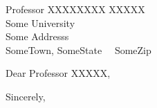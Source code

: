 \documentclass[12pt]{NUAAletter}
\date{\vspace{10mm} \today}
\makeatletter
\def\name{Your Name}
\def\Position{\vspace*{.5\baselineskip}\textbf{\color{nuaablue}Chair for Doing Nothing But Sleeping and Eating}}
\def\Title{\hspace{-1.2mm}\textbf{\color{nuaablue}Prof.~Dr.~\name}}
\def\TEL{
\vspace*{.5\baselineskip}
\textbf{Contact}\\
{\color{nuaablue}Phone}: +86-12345678987}
\def\Where{
\vspace*{.5\baselineskip}
\textbf{\color{nuaablue}
College of Zhihu, Bilibili, and Youtube Engineering
}}
\def\Address{29 Jiangjun Ave., Nanjing~211106, China}
\def\Email{{\color{nuaablue}e-mail}: your.name@nuaa.edu.cn}
\def\Website{{\color{nuaablue}website}: \url{your.website}}
\def\newaddress{
\Title\\
\Position\\
\TEL\\ 
\Email\\ 
\Website\\
\Where\\ 
\Address\\ 

}
\makeatother
\begin{document}
%
%
%
\begin{letter}{ 
			   Professor XXXXXXXX XXXXX\\ 
               Some University\\ 
               Some Addresss\\ 
               SomeTown, SomeState 					       				  		 ~~SomeZip
               }

%


%
\opening{Dear Professor XXXXX,}

%
\lipsum[1-2]

\closing{Sincerely,}




\end{letter}
\end{document}
